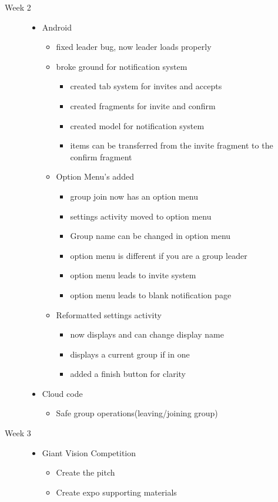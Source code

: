 \documentclass[11pt]{article}
\begin{document}
\begin{description}
  \item[Week 2] \hfill
		\begin{itemize}
		\item Android
		\begin{itemize}
			\item fixed leader bug, now leader loads properly
			\item broke ground for notification system
			\begin{itemize}
				\item created tab system for invites and accepts
				\item created fragments for invite and confirm
				\item created model for notification system
				\item items can be transferred from the invite fragment to the confirm fragment
			\end{itemize}
			\item Option Menu's added 
			\begin{itemize}
				\item group join now has an option menu
				\item settings activity moved to option menu
				\item Group name can be changed in option menu
				\item option menu is different if you are a group leader
				\item option menu leads to invite system
				\item option menu leads to blank notification page
			\end{itemize}
			\item Reformatted settings activity
			\begin{itemize}
				\item now displays and can change display name
				\item displays a current group if in one
				\item added a finish button for clarity
			\end{itemize}
		\end{itemize}
		\item Cloud code
		\begin{itemize}
			\item Safe group operations(leaving/joining group)
		\end{itemize}
	\end{itemize}
  
  \item[Week 3] \hfill
		\begin{itemize}
		\item Giant Vision Competition
		\begin{itemize}
			\item Create the pitch
			\item Create expo supporting materials
		\end{itemize}
	\end{itemize}
\end{description}
\end{document}
